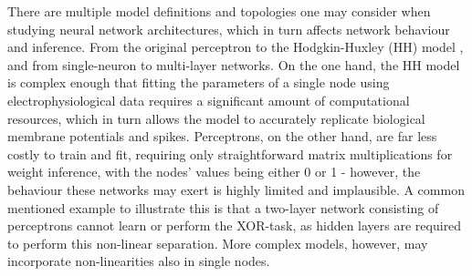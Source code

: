 \documentclass[mphil,deptreport,ianc]{infthesis} %
\begin{document}
There are multiple model definitions and topologies one may consider when studying neural network architectures, which in turn affects network behaviour and inference.
From the original perceptron \cite{McCulloch1943, Rosenblatt1956} to the Hodgkin-Huxley (HH) model \cite{HH1952}, and from single-neuron to multi-layer networks.
On the one hand, the HH model is complex enough that fitting the parameters of a single node using electrophysiological data requires a significant amount of computational resources, which in turn allows the model to accurately replicate biological membrane potentials and spikes.
Perceptrons, on the other hand, are far less costly to train and fit, requiring only straightforward matrix multiplications for weight inference, with the nodes' values being either 0 or 1 - however, the behaviour these networks may exert is highly limited and implausible.
A common mentioned example to illustrate this is that a two-layer network consisting of perceptrons cannot learn or perform the XOR-task, as hidden layers are required to perform this non-linear separation.
More complex models, however, may incorporate non-linearities also in single nodes.

\end{document}
